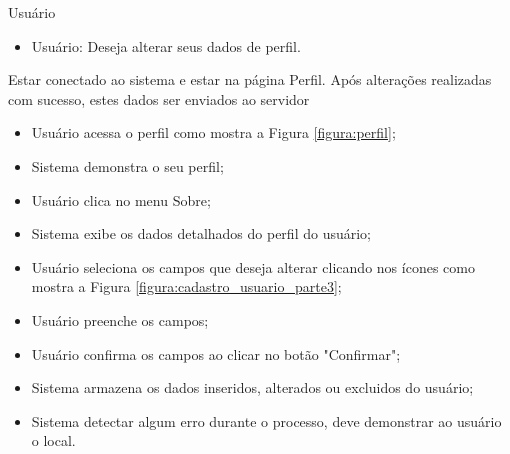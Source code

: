 {Usuário}
{
\begin{itemize}
	\item Usuário: Deseja alterar seus dados de perfil.	
\end{itemize}
}
{Estar conectado ao sistema e estar na página Perfil.}
{Após alterações realizadas com sucesso, estes dados ser enviados ao servidor}
{
\begin{itemize}
	\item Usuário acessa o perfil como mostra a Figura \ref{figura:perfil};
	\item Sistema demonstra o seu perfil;
	\item Usuário clica no menu Sobre;
 	\item Sistema exibe os dados detalhados do perfil do usuário;
	\item Usuário seleciona os campos que deseja alterar clicando nos ícones como mostra a Figura \ref{figura:cadastro_usuario_parte3};
	\item Usuário preenche os campos;
	\item Usuário confirma os campos ao clicar no botão "Confirmar";
	\item Sistema armazena os dados inseridos, alterados ou excluidos do usuário;
	\item Sistema detectar algum erro durante o processo, deve demonstrar ao usuário o local.
\end{itemize}
}
